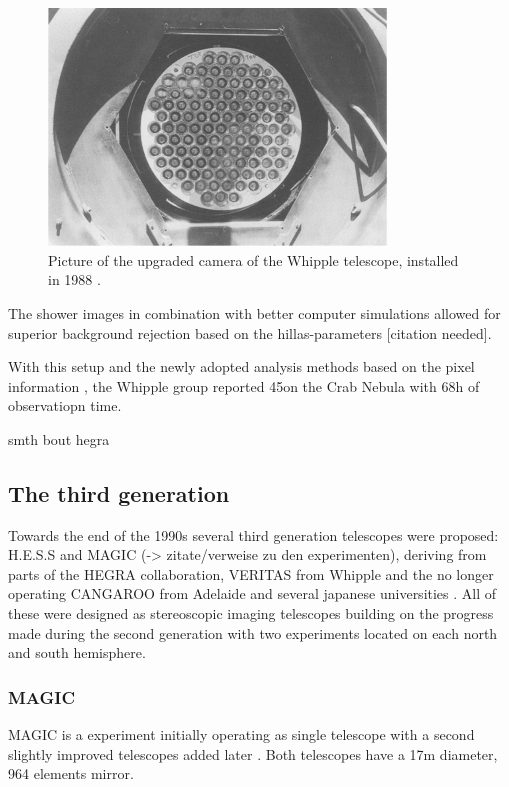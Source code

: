 \begin{figure}
    \includegraphics[width=0.8\textwidth]{images/whipple_cam.png}
    \caption{Picture of the upgraded camera of the Whipple telescope, installed in 1988 \cite{Cawley1995}.}  %
    \label{fig:whipple_cam}
\end{figure}

The shower images in combination with better computer simulations allowed for 
superior background rejection based on the  hillas-parameters [citation needed].

With this setup and the newly adopted analysis methods based on the pixel information , 
the Whipple group reported 45\sigma on the Crab Nebula with 68h of observatiopn time.

smth bout hegra


\subsection{The third generation}

Towards the end of the 1990s several third generation telescopes were
proposed:
H.E.S.S and MAGIC (-> zitate/verweise zu den experimenten), deriving from parts of the HEGRA collaboration, 
VERITAS from Whipple and the no longer operating CANGAROO from Adelaide and 
several japanese universities \cite{HILLAS201319}.
All of these were designed as stereoscopic imaging telescopes building on the progress made during the 
second generation with two experiments located on each north and south hemisphere.

\subsubsection{MAGIC}
MAGIC is a experiment initially operating as single telescope with a second slightly improved 
telescopes added later \cite{BAIXERAS2003247}.
Both telescopes have a 17m diameter, 964 elements mirror.

